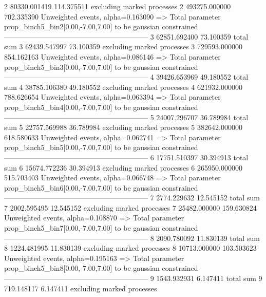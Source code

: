 2          80330.001419    114.375511      excluding marked processes    
2          493275.000000   702.335390      Unweighted events, alpha=0.163090
  => Total parameter prop_binch5_bin2[0.00,-7.00,7.00] to be gaussian constrained
------------------------------------------------------------
3          62851.692400    73.100359       total sum                     
3          62439.547997    73.100359       excluding marked processes    
3          729593.000000   854.162163      Unweighted events, alpha=0.086146
  => Total parameter prop_binch5_bin3[0.00,-7.00,7.00] to be gaussian constrained
------------------------------------------------------------
4          39426.653969    49.180552       total sum                     
4          38785.106380    49.180552       excluding marked processes    
4          621932.000000   788.626654      Unweighted events, alpha=0.063394
  => Total parameter prop_binch5_bin4[0.00,-7.00,7.00] to be gaussian constrained
------------------------------------------------------------
5          24007.296707    36.789984       total sum                     
5          22757.569988    36.789984       excluding marked processes    
5          382642.000000   618.580633      Unweighted events, alpha=0.062741
  => Total parameter prop_binch5_bin5[0.00,-7.00,7.00] to be gaussian constrained
------------------------------------------------------------
6          17751.510397    30.394913       total sum                     
6          15674.772236    30.394913       excluding marked processes    
6          265950.000000   515.703403      Unweighted events, alpha=0.066748
  => Total parameter prop_binch5_bin6[0.00,-7.00,7.00] to be gaussian constrained
------------------------------------------------------------
7          2774.229632     12.545152       total sum                     
7          2002.595495     12.545152       excluding marked processes    
7          25482.000000    159.630824      Unweighted events, alpha=0.108870
  => Total parameter prop_binch5_bin7[0.00,-7.00,7.00] to be gaussian constrained
------------------------------------------------------------
8          2090.780092     11.830139       total sum                     
8          1224.481995     11.830139       excluding marked processes    
8          10713.000000    103.503623      Unweighted events, alpha=0.195163
  => Total parameter prop_binch5_bin8[0.00,-7.00,7.00] to be gaussian constrained
------------------------------------------------------------
9          1543.932931     6.147411        total sum                     
9          719.148117      6.147411        excluding marked processes    
